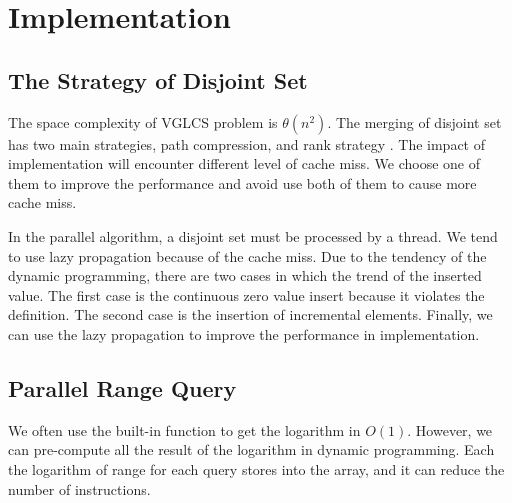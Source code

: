 \section{Implementation}
\label{sec:Implementation}

\subsection{The Strategy of Disjoint Set}

The space complexity of VGLCS problem is $\theta(n^2)$.  The merging
of disjoint set has two main strategies, path compression, and rank
strategy \cite{Patwary2010ExperimentsOU}.  The impact of
implementation will encounter different level of cache miss.  We
choose one of them to improve the performance and avoid use both of
them to cause more cache miss.

\iffalse
運行 VGLCS 時，將耗費 $\theta(n^2)$ 的內存空間。使用遞增後綴最大值 (ISMQ) 時，
採用並查集實作將會遭遇到很多不平衡的工作負載，其原因在於合併的策略，
常見的有路徑壓縮和啟發式合併兩種策略，這間接影響到不同次數的分枝判斷。
實務上須考慮到快取未中，故兩種策略只能擇其一，兩者皆用將引發更多的快取未中而導致效能下滑。
\fi

In the parallel algorithm, a disjoint set must be processed by a
thread.  We tend to use lazy propagation because of the cache miss.
Due to the tendency of the dynamic programming, there are two cases in
which the trend of the inserted value.  The first case is the
continuous zero value insert because it violates the definition.  The
second case is the insertion of incremental elements.  Finally, we can
use the lazy propagation to improve the performance in implementation.

\iffalse
每個執行緒負責數個完整的并查集，操作時應偏向延遲標記操作，
儘早合併的策略易造成快取未中。由於動態規劃的傾向中，插入值的趨勢有兩種情況，
其一為連續不合定義的零元素插入，其二為遞增元素的插入，在這兩者穿插的趨勢中，
我們發現延遲操作將會帶來較能改善快取未中問題。
\fi

\subsection{Parallel Range Query}

We often use the built-in function to get the logarithm in $O(1)$.
However, we can pre-compute all the result of the logarithm in dynamic
programming.  Each the logarithm of range for each query stores into
the array, and it can reduce the number of instructions.

